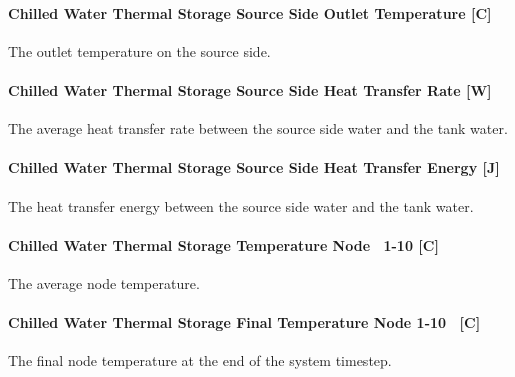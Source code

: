 \paragraph{Chilled Water Thermal Storage Source Side Outlet Temperature {[}C{]}}\label{chilled-water-thermal-storage-source-side-outlet-temperature-c-1}

The outlet temperature on the source side.

\paragraph{Chilled Water Thermal Storage Source Side Heat Transfer Rate {[}W{]}}\label{chilled-water-thermal-storage-source-side-heat-transfer-rate-w-1}

The average heat transfer rate between the source side water and the tank water.

\paragraph{Chilled Water Thermal Storage Source Side Heat Transfer Energy {[}J{]}}\label{chilled-water-thermal-storage-source-side-heat-transfer-energy-j-1}

The heat transfer energy between the source side water and the tank water.

\paragraph{Chilled Water Thermal Storage Temperature Node~ 1-10 {[}C{]}}\label{chilled-water-thermal-storage-temperature-node-1-10-c}

The average node temperature.

\paragraph{Chilled Water Thermal Storage Final Temperature Node 1-10~ {[}C{]}}\label{chilled-water-thermal-storage-final-temperature-node-1-10-c}

The final node temperature at the end of the system timestep.

